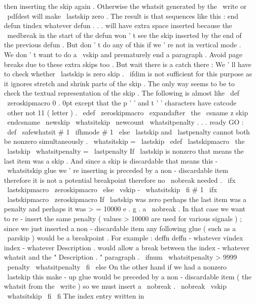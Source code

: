 {{{{then
inserting
%
the
skip
again
.
Otherwise
the
whatsit
generated
by
the
%
\
write
or
\
pdfdest
will
make
\
lastskip
zero
.
The
result
is
that
%
sequences
like
this
:
%
end
defun
%
tindex
whatever
%
defun
.
.
.
%
will
have
extra
space
inserted
because
the
\
medbreak
in
the
%
start
of
the
defun
won
'
t
see
the
skip
inserted
by
the
end
of
%
the
previous
defun
.
%
%
But
don
'
t
do
any
of
this
if
we
'
re
not
in
vertical
mode
.
We
%
don
'
t
want
to
do
a
\
vskip
and
prematurely
end
a
paragraph
.
%
%
Avoid
page
breaks
due
to
these
extra
skips
too
.
%
%
But
wait
there
is
a
catch
there
:
%
We
'
ll
have
to
check
whether
\
lastskip
is
zero
skip
.
\
ifdim
is
not
%
sufficient
for
this
purpose
as
it
ignores
stretch
and
shrink
parts
%
of
the
skip
.
The
only
way
seems
to
be
to
check
the
textual
%
representation
of
the
skip
.
%
%
The
following
is
almost
like
\
def
\
zeroskipmacro
{
0
.
0pt
}
except
that
%
the
p
'
'
and
t
'
'
characters
have
catcode
\
other
not
11
(
letter
)
.
%
\
edef
\
zeroskipmacro
{
\
expandafter
\
the
\
csname
z
skip
\
endcsname
}
%
\
newskip
\
whatsitskip
\
newcount
\
whatsitpenalty
%
%
.
.
.
ready
GO
:
%
\
def
\
safewhatsit
#
1
{
\
ifhmode
#
1
%
\
else
%
\
lastskip
and
\
lastpenalty
cannot
both
be
nonzero
simultaneously
.
\
whatsitskip
=
\
lastskip
\
edef
\
lastskipmacro
{
\
the
\
lastskip
}
%
\
whatsitpenalty
=
\
lastpenalty
%
%
If
\
lastskip
is
nonzero
that
means
the
last
item
was
a
%
skip
.
And
since
a
skip
is
discardable
that
means
this
%
-
\
whatsitskip
glue
we
'
re
inserting
is
preceded
by
a
%
non
-
discardable
item
therefore
it
is
not
a
potential
%
breakpoint
therefore
no
\
nobreak
needed
.
\
ifx
\
lastskipmacro
\
zeroskipmacro
\
else
\
vskip
-
\
whatsitskip
\
fi
%
#
1
%
%
\
ifx
\
lastskipmacro
\
zeroskipmacro
%
If
\
lastskip
was
zero
perhaps
the
last
item
was
a
penalty
and
%
perhaps
it
was
>
=
10000
e
.
g
.
a
\
nobreak
.
In
that
case
we
want
%
to
re
-
insert
the
same
penalty
(
values
>
10000
are
used
for
various
%
signals
)
;
since
we
just
inserted
a
non
-
discardable
item
any
%
following
glue
(
such
as
a
\
parskip
)
would
be
a
breakpoint
.
For
example
:
%
deffn
deffn
-
whatever
%
vindex
index
-
whatever
%
Description
.
%
would
allow
a
break
between
the
index
-
whatever
whatsit
%
and
the
"
Description
.
"
paragraph
.
\
ifnum
\
whatsitpenalty
>
9999
\
penalty
\
whatsitpenalty
\
fi
\
else
%
On
the
other
hand
if
we
had
a
nonzero
\
lastskip
%
this
make
-
up
glue
would
be
preceded
by
a
non
-
discardable
item
%
(
the
whatsit
from
the
\
write
)
so
we
must
insert
a
\
nobreak
.
\
nobreak
\
vskip
\
whatsitskip
\
fi
\
fi
}
%
The
index
entry
written
in
}}}}
